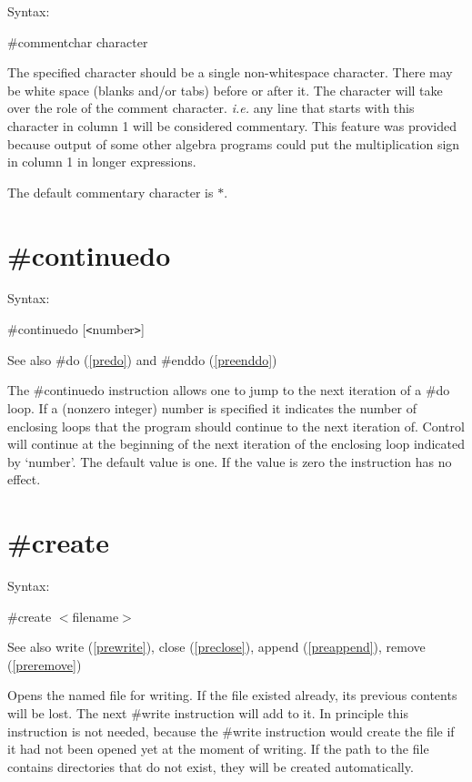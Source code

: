 \noindent Syntax:

\#commentchar character

\noindent The specified character should be a single 
non-whitespace character. There may be white space (blanks and/or tabs) 
before or after it. The character will take over the role of the comment 
character. {\it i.e.} any line that starts with this character in column 1 
will be considered commentary. This feature was provided 
because output of some other algebra programs could put the multiplication 
sign in column 1 in longer expressions.

The default commentary character is $\ast$.


\section{\#continuedo}
\label{precontinuedo}

\noindent Syntax:

\#continuedo [{\tt<}number{\tt>}]

\noindent See also \#do (\ref{predo}) and \#enddo (\ref{preenddo})

\noindent The \#continuedo instruction allows one to
jump to the next iteration of a \#do loop.
If a (nonzero integer) number is specified
it indicates the number of enclosing loops
that the program should continue to the next iteration of.
Control will continue at the beginning of the next iteration
of the enclosing loop indicated by `number'.
The default value is one.
If the value is zero the instruction has no effect.

 
\section{\#create}
\label{precreate}

\noindent Syntax:

\#create $<$filename$>$
 
\noindent See also write (\ref{prewrite}),
            close (\ref{preclose}), append (\ref{preappend}),
            remove (\ref{preremove})

\noindent Opens the named file for writing. If the file 
existed already, its previous contents will be lost. The next 
\#write instruction will add to it. In principle this 
instruction is not needed, because the \#write instruction would create the 
file if it had not been opened yet at the moment of writing. If the path to 
the file contains directories that do not exist, they will be created 
automatically.

